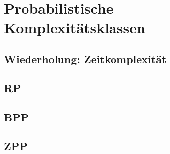 \section{Probabilistische Komplexitätsklassen}


\subsection{Wiederholung: Zeitkomplexität}


\subsection{RP}


\subsection{BPP}


\subsection{ZPP}